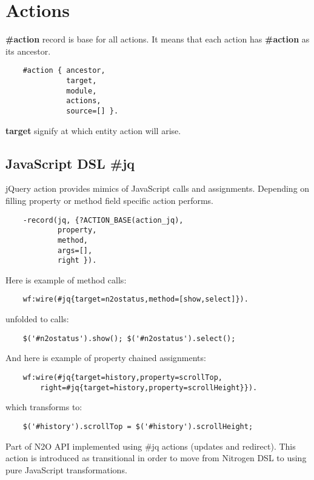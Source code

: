 \section{Actions}
{\bf \#action} record is base for all actions. It means that each action
has {\bf \#action} as its ancestor.

\vspace{1\baselineskip}
\begin{lstlisting}
    #action { ancestor,
              target,
              module,
              actions,
              source=[] }.
\end{lstlisting}
\vspace{1\baselineskip}

{\bf target} signify at which entity action will arise.

\subsection{JavaScript DSL {\bf \#jq}}
jQuery action provides mimics of JavaScript calls and assignments.
Depending on filling property or method field specific action performs.

\vspace{1\baselineskip}
\begin{lstlisting}
    -record(jq, {?ACTION_BASE(action_jq),
            property,
            method,
            args=[],
            right }).
\end{lstlisting}
\vspace{1\baselineskip}

Here is example of method calls:
\begin{lstlisting}
    wf:wire(#jq{target=n2ostatus,method=[show,select]}).
\end{lstlisting}
unfolded to calls:
\begin{lstlisting}
    $('#n2ostatus').show(); $('#n2ostatus').select();
\end{lstlisting}
\vspace{1\baselineskip}

And here is example of property chained assignments:
\begin{lstlisting}
    wf:wire(#jq{target=history,property=scrollTop,
        right=#jq{target=history,property=scrollHeight}}).
\end{lstlisting}
which transforms to:
\begin{lstlisting}
    $('#history').scrollTop = $('#history').scrollHeight;
\end{lstlisting}
\vspace{1\baselineskip}
Part of N2O API implemented using \#jq actions (updates and redirect).
This action is introduced as transitional in order to move
from Nitrogen DSL to using pure JavaScript transformations.

